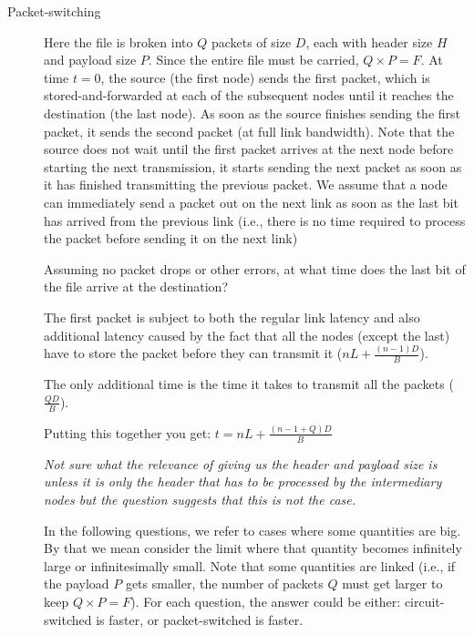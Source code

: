 \documentclass[answers]{supervision}
\begin{document}
\begin{questions}
\begin{parts}
\begin{description}
\begin{subparts}
        
        
      \end{subparts}
      
      \item[Packet-switching]
      Here the file is broken into $Q$ packets of size $D$, each with header size $H$ and payload size $P$. Since the entire file must be carried, $Q \times P = F$. At time $t = 0$, the source (the first node) sends the first packet, which is stored-and-forwarded at each of the subsequent nodes until it reaches the destination (the last node). As soon as the source finishes sending the first packet, it sends the second packet (at full link bandwidth). Note that the source does not wait until the first packet arrives at the next node before starting the next transmission, it starts sending the next packet as soon as it has finished transmitting the previous packet. We assume that a node can immediately send a packet out on the next link as soon as the last bit has arrived from the previous link (i.e., there is no time required to process the packet before sending it on the next link)
      \begin{subparts}
        \subpart
        Assuming no packet drops or other errors, at what time does
the last bit of the file arrive at the destination?
        
        \begin{solution}
        The first packet is subject to both the regular link latency and also additional latency caused by the fact that all the nodes (except the last) have to store the packet before they can transmit it ($nL + \frac{(n-1)D}{B}$).
        
        The only additional time is the time it takes to transmit all the packets ($\frac{QD}{B}$).
        
        Putting this together you get: $t = nL + \frac{(n-1 + Q)D}{B}$
        
        \textit{Not sure what the relevance of giving us the header and payload size is unless it is only the header that has to be processed by the intermediary nodes but the question suggests that this is not the case.}
        \end{solution}

      \end{subparts}
      In the following questions, we refer to cases where some quantities are big. By that we mean consider the limit where that quantity becomes infinitely large or infinitesimally small. Note that some quantities are linked (i.e., if the payload $P$ gets smaller, the number of packets $Q$ must get larger to keep $Q \times P = F$). For each question, the answer could be either: circuit-switched is faster, or packet-switched is faster.
      

\end{description}
\end{parts}
\end{questions}
\end{document}
